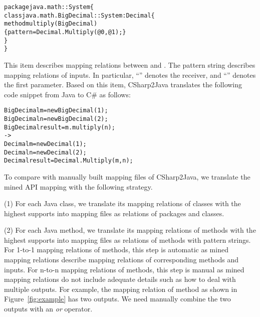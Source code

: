 \begin{CodeOut}\vspace*{-1ex}
\begin{alltt}
package java.math :: System \{
  class java.math.BigDecimal :: System:Decimal \{
    method multiply(BigDecimal)
       \{ pattern =  Decimal.Multiply(@0, @1); \}
  \}
\}
\end{alltt}
\end{CodeOut}\vspace*{-1ex}

This item describes mapping relations between  and . The
pattern string describes mapping relations of inputs. In particular,
``'' denotes the receiver, and ``'' denotes
the first parameter. Based on this item, CSharp2Java translates the
following code snippet from Java to C\# as follows:

\begin{CodeOut}\vspace*{-1ex}
\begin{alltt}
  BigDecimal m = new BigDecimal(1);
  BigDecimal n = new BigDecimal(2);
  BigDecimal result = m.multiply(n);
  ->
  Decimal m = new Decimal(1);
  Decimal n = new Decimal(2);
  Decimal result = Decimal.Multiply(m,n);
\end{alltt}
\end{CodeOut}\vspace*{-1ex}

To compare with manually built mapping files of CSharp2Java, we
translate the mined API mapping with the following strategy.

(1) For each Java class, we translate its mapping relations of
classes with the highest supports into mapping files as relations of
packages and classes.

(2) For each Java method, we translate its mapping relations of
methods with the highest supports into mapping files as relations of
methods with pattern strings. For 1-to-1 mapping relations of
methods, this step is automatic as mined mapping relations describe
mapping relations of corresponding methods and inputs. For n-to-n
mapping relations of methods, this step is manual as mined mapping
relations do not include adequate details such as how to deal with
multiple outputs. For example, the mapping relation of method as
shown in Figure~\ref{fig:example} has two outputs. We need manually
combine the two outputs with an \emph{or} operator.

